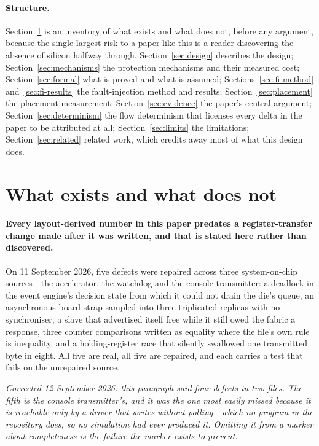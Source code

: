\documentclass[11pt,a4paper]{article}
\begin{document}
\paragraph{Structure.}
Section~\ref{sec:inventory} is an inventory of what exists and what does
not, before any argument, because the single largest risk to a paper like
this is a reader discovering the absence of silicon halfway through.
Section~\ref{sec:design} describes the design;
Section~\ref{sec:mechanisms} the protection mechanisms and their measured
cost; Section~\ref{sec:formal} what is proved and what is assumed;
Sections~\ref{sec:fi-method} and~\ref{sec:fi-results} the fault-injection
method and results; Section~\ref{sec:placement} the placement
measurement; Section~\ref{sec:evidence} the paper's central argument;
Section~\ref{sec:determinism} the flow determinism that licenses every
delta in the paper to be attributed at all; Section~\ref{sec:limits} the
limitations; Section~\ref{sec:related} related work, which credits away
most of what this design does.

\section{What exists and what does not}
\label{sec:inventory}

\paragraph{Every layout-derived number in this paper predates a
register-transfer change made after it was written, and that is stated
here rather than discovered.}
On 11 September 2026, five defects were repaired across three
system-on-chip sources---the accelerator, the watchdog and the console
transmitter: a deadlock in the event engine's decision state from which
it could not drain the die's queue, an asynchronous board strap sampled
into three triplicated replicas with no synchroniser, a slave that
advertised itself free while it still owed the fabric a response, three
counter comparisons written as equality where the file's own rule is
inequality, and a holding-register race that silently swallowed one
transmitted byte in eight. All five are real, all five are repaired, and
each carries a test that fails on the unrepaired source.

\emph{Corrected 12 September 2026: this paragraph said four defects in
two files. The fifth is the console transmitter's, and it was the one
most easily missed because it is reachable only by a driver that writes
without polling---which no program in the repository does, so no
simulation had ever produced it. Omitting it from a marker about
completeness is the failure the marker exists to prevent.}
\end{document}
